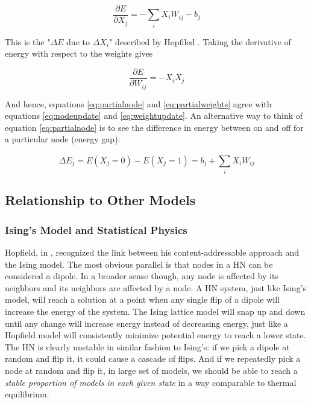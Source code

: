 \documentclass[11pt]{article}
\begin{document}
	\begin{equation}\label{eq:partialnode}
		\frac{\partial E}{\partial X_j} = - \sum^{}_{i} X_i W_{ij} - b_j
	\end{equation}
	
	This is the  "$\Delta E$ due to $\Delta X_i$" described by Hopfiled \cite{hopfield1982neural}. Taking the derivative of energy with respect to the weights gives
	
	\begin{equation}\label{eq:partialweights}
		\frac{\partial E}{\partial W_{ij}} = - X_i X_j
	\end{equation}

	And hence, equations \ref{eq:partialnode} and \ref{eq:partialweights} agree with equations \ref{eq:nodeupdate} and \ref{eq:weightupdate}. 
	An alternative way to think of equation \ref{eq:partialnode} is to see the difference in energy between on and off for a particular node (energy gap):
	
	\begin{equation}
		\Delta E_j = E(X_j = 0) - E(X_j = 1) = b_j + \sum^{}_{i}X_i W_{ij}
	\end{equation}

	\subsection{Relationship to Other Models}\label{other}

	\subsubsection{Ising's Model and Statistical Physics}\label{ising}
	Hopfield, in \cite{hopfield1982neural}, recognized the link between his content-addressable approach and the Ising model. 
	The most obvious parallel is that nodes in a HN can be considered a dipole. 
	In a broader sense though, any node is affected by its neighbors and its neighbors are affected by a node. 
	A HN system, just like Ising's model, will reach a solution at a point when any single flip of a dipole will increase the energy of the system. 
	The Ising lattice model will snap up and down until any change will increase energy instead of decreasing energy, just like a Hopfield model will consistently minimize potential energy to reach a lower state. 
	The HN is clearly unstable in similar fashion to Ising's: if we pick a dipole at random and flip it, it could cause a cascade of flips.
	And if we repeatedly pick a node at random and flip it, in large set of models, we should be able to reach a \textit{stable proportion of models in each given state} in a way comparable to thermal equilibrium.
\end{document}

